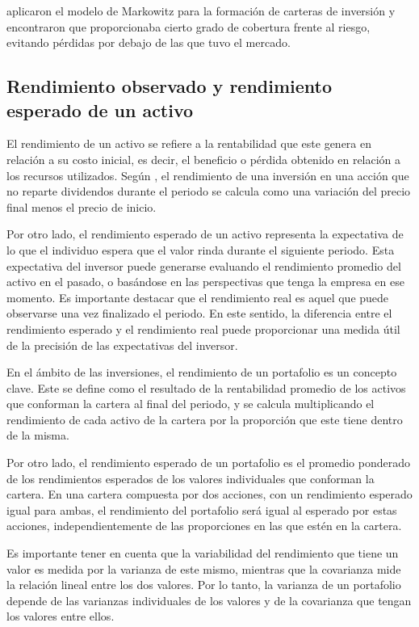 \documentclass[a4paper,fleqn]{cas-sc}
\begin{document}
\cite{Galvez} aplicaron el modelo de Markowitz para la formación de carteras de inversión y encontraron que proporcionaba cierto grado de cobertura frente al riesgo, evitando pérdidas por debajo de las que tuvo el mercado.

\subsection{Rendimiento observado y rendimiento esperado de un activo}

El rendimiento de un activo se refiere a la rentabilidad que este genera en relación a su costo inicial, es decir, el beneficio o pérdida obtenido en relación a los recursos utilizados. Según \cite{Gonzalez}, el rendimiento de una inversión en una acción que no reparte dividendos durante el periodo se calcula como una variación del precio final menos el precio de inicio.

Por otro lado, el rendimiento esperado de un activo representa la expectativa de lo que el individuo espera que el valor rinda durante el siguiente periodo. Esta expectativa del inversor puede generarse evaluando el rendimiento promedio del activo en el pasado, o basándose en las perspectivas que tenga la empresa en ese momento. Es importante destacar que el rendimiento real es aquel que puede observarse una vez finalizado el periodo. En este sentido, la diferencia entre el rendimiento esperado y el rendimiento real puede proporcionar una medida útil de la precisión de las expectativas del inversor.

En el ámbito de las inversiones, el rendimiento de un portafolio es un concepto clave. Este se define como el resultado de la rentabilidad promedio de los activos que conforman la cartera al final del periodo, y se calcula multiplicando el rendimiento de cada activo de la cartera por la proporción que este tiene dentro de la misma.

Por otro lado, el rendimiento esperado de un portafolio es el promedio ponderado de los rendimientos esperados de los valores individuales que conforman la cartera. En una cartera compuesta por dos acciones, con un rendimiento esperado igual para ambas, el rendimiento del portafolio será igual al esperado por estas acciones, independientemente de las proporciones en las que estén en la cartera.

Es importante tener en cuenta que la variabilidad del rendimiento que tiene un valor es medida por la varianza de este mismo, mientras que la covarianza mide la relación lineal entre los dos valores. Por lo tanto, la varianza de un portafolio depende de las varianzas individuales de los valores y de la covarianza que tengan los valores entre ellos.
\end{document}
